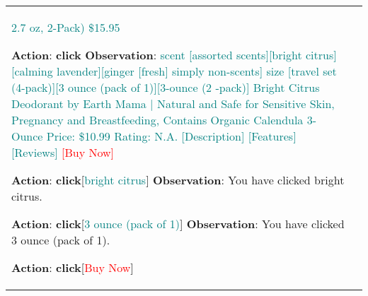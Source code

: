 \begin{table}[H]
\begin{tabular}{l|l}
{\textcolor{teal}{2.7 oz, 2-Pack) }\\
\textcolor{teal}{\$15.95}\\
\\
\textbf{Action}: \textbf{click}\textcolor{purple}{}\\
\textbf{Observation}:\\
\textcolor{red}{} \\
\textcolor{red}{} \\
\textcolor{teal}{scent [assorted scents][bright citrus][calming lavender][ginger}\\ \textcolor{teal}{[fresh] simply non-scents]}\\
\textcolor{teal}{size [travel set (4-pack)][3 ounce (pack of 1)][3-ounce (2}\\ \textcolor{teal}{-pack)]}\\
\textcolor{teal}{Bright Citrus Deodorant by Earth Mama | Natural and Safe for }\\
\textcolor{teal}{  Sensitive Skin, Pregnancy and Breastfeeding, Contains Organic }\\
\textcolor{teal}{  Calendula 3-Ounce }\\
\textcolor{teal}{Price: \$10.99}\\
\textcolor{teal}{Rating: N.A.}\\
\textcolor{teal}{[Description]}\\
\textcolor{teal}{[Features]}\\
\textcolor{teal}{[Reviews]}\\
\textcolor{red}{[Buy Now]}\\
\\
\textbf{Action}: \textbf{click}[\textcolor{teal}{bright citrus}]\\
\textbf{Observation}: You have clicked bright citrus.\\
\\
\textbf{Action}: \textbf{click}[\textcolor{teal}{3 ounce (pack of 1)}]\\
\textbf{Observation}: You have clicked 3 ounce (pack of 1).\\
\\
\textbf{Action}: \textbf{click}[\textcolor{red}{Buy Now}]\\
}

&


\end{tabular}
\end{table}

